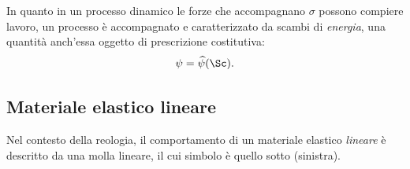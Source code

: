 In quanto in un processo dinamico le forze che accompagnano $\sigma$ possono compiere lavoro, un processo è accompagnato e caratterizzato da scambi di \textit{energia}, una quantità anch'essa oggetto di prescrizione costitutiva:
%
%
\begin{equation}
	\psi=\widehat{\psi}(\Sc).
\end{equation}

\subsection{Materiale elastico lineare}
Nel contesto della reologia, il comportamento di un materiale elastico \textit{lineare} è  descritto da una molla lineare, il cui simbolo è quello sotto (sinistra). 


